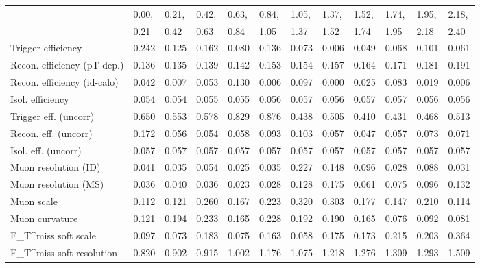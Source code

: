 \begin{tabular}{l|p{0.6cm}p{0.6cm}p{0.6cm}p{0.6cm}p{0.6cm}p{0.6cm}p{0.6cm}p{0.6cm}p{0.6cm}p{0.6cm}p{0.6cm}}
\hline
   & 0.00, & 0.21, & 0.42, & 0.63, & 0.84, & 1.05, & 1.37, & 1.52, & 1.74, & 1.95, & 2.18,  \\ 
   & 0.21 & 0.42 & 0.63 & 0.84 & 1.05 & 1.37 & 1.52 & 1.74 & 1.95 & 2.18 & 2.40  \\ 
\hline
Trigger efficiency                       & 0.242 & 0.125 & 0.162 & 0.080 & 0.136 & 0.073 & 0.006 & 0.049 & 0.068 & 0.101 & 0.061 \\
Recon. efficiency (pT dep.)              & 0.136 & 0.135 & 0.139 & 0.142 & 0.153 & 0.154 & 0.157 & 0.164 & 0.171 & 0.181 & 0.191 \\
Recon. efficiency (id-calo)              & 0.042 & 0.007 & 0.053 & 0.130 & 0.006 & 0.097 & 0.000 & 0.025 & 0.083 & 0.019 & 0.006 \\
Isol. efficiency                         & 0.054 & 0.054 & 0.055 & 0.055 & 0.056 & 0.057 & 0.056 & 0.057 & 0.057 & 0.056 & 0.056 \\
Trigger eff. (uncorr)                    & 0.650 & 0.553 & 0.578 & 0.829 & 0.876 & 0.438 & 0.505 & 0.410 & 0.431 & 0.468 & 0.513 \\
Recon. eff. (uncorr)                     & 0.172 & 0.056 & 0.054 & 0.058 & 0.093 & 0.103 & 0.057 & 0.047 & 0.057 & 0.073 & 0.071 \\
Isol. eff. (uncorr)                      & 0.057 & 0.057 & 0.057 & 0.057 & 0.057 & 0.057 & 0.057 & 0.057 & 0.057 & 0.057 & 0.057 \\
Muon resolution (ID)                     & 0.041 & 0.035 & 0.054 & 0.025 & 0.035 & 0.227 & 0.148 & 0.096 & 0.028 & 0.088 & 0.031 \\
Muon resolution (MS)                     & 0.036 & 0.040 & 0.036 & 0.023 & 0.028 & 0.128 & 0.175 & 0.061 & 0.075 & 0.096 & 0.132 \\
Muon scale                               & 0.112 & 0.121 & 0.260 & 0.167 & 0.223 & 0.320 & 0.303 & 0.177 & 0.147 & 0.210 & 0.114 \\
Muon curvature                           & 0.121 & 0.194 & 0.233 & 0.165 & 0.228 & 0.192 & 0.190 & 0.165 & 0.076 & 0.092 & 0.081 \\
E_{T}^{miss} soft scale                  & 0.097 & 0.073 & 0.183 & 0.075 & 0.163 & 0.058 & 0.175 & 0.173 & 0.215 & 0.203 & 0.364 \\
E_{T}^{miss} soft resolution             & 0.820 & 0.902 & 0.915 & 1.002 & 1.176 & 1.075 & 1.218 & 1.276 & 1.309 & 1.293 & 1.509 \\

\end{tabular}
